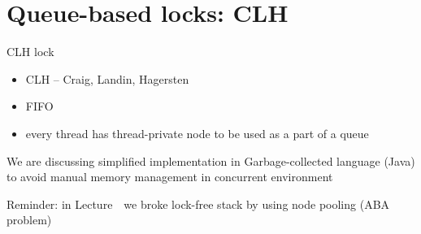 \section{Queue-based locks: CLH}
\showTOC

\begin{frame}{CLH lock}

\begin{itemize}
  \item CLH -- Craig, Landin, Hagersten
  \item FIFO
  \item every thread has thread-private node to be used as a part of a queue
\end{itemize}  

\pause
We are discussing simplified implementation in Garbage-collected language (Java) to avoid manual memory management in concurrent environment

\pause
Reminder: in Lecture~\atomicsNum \ we broke lock-free stack by using node pooling (ABA problem)

\end{frame}


